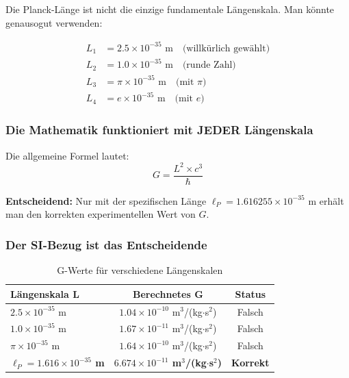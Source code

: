 	Die Planck-Länge ist nicht die einzige fundamentale Längenskala. Man könnte genausogut verwenden:
	
	\begin{align}
		L_1 &= 2.5 \times 10^{-35} \text{ m} \quad \text{(willkürlich gewählt)}\\
		L_2 &= 1.0 \times 10^{-35} \text{ m} \quad \text{(runde Zahl)}\\
		L_3 &= \pi \times 10^{-35} \text{ m} \quad \text{(mit } \pi \text{)}\\
		L_4 &= e \times 10^{-35} \text{ m} \quad \text{(mit } e \text{)}
	\end{align}
	
	\subsubsection{Die Mathematik funktioniert mit JEDER Längenskala}
	
	Die allgemeine Formel lautet:
	\begin{equation}
		G = \frac{L^2 \times c^3}{\hbar}
	\end{equation}
	
	\textbf{Entscheidend:} Nur mit der spezifischen Länge $\ell_P = 1.616255 \times 10^{-35}$ m erhält man den korrekten experimentellen Wert von $G$.
	
	\subsubsection{Der SI-Bezug ist das Entscheidende}
	
	\begin{table}[h]
		\centering
		\begin{tabular}{@{}lcc@{}}
			\toprule
			\textbf{Längenskala L} & \textbf{Berechnetes G} & \textbf{Status} \\
			\midrule
			$2.5 \times 10^{-35}$ m & $1.04 \times 10^{-10}$ m$^3$/(kg$\cdot$s$^2$) & Falsch \\
			$1.0 \times 10^{-35}$ m & $1.67 \times 10^{-11}$ m$^3$/(kg$\cdot$s$^2$) & Falsch \\
			$\pi \times 10^{-35}$ m & $1.64 \times 10^{-10}$ m$^3$/(kg$\cdot$s$^2$) & Falsch \\
			\textbf{$\ell_P = 1.616 \times 10^{-35}$ m} & \textbf{$6.674 \times 10^{-11}$ m$^3$/(kg$\cdot$s$^2$)} & \textbf{Korrekt} \\
			\bottomrule
		\end{tabular}
		\caption{G-Werte für verschiedene Längenskalen}
	\end{table}
	
